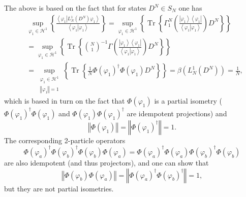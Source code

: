 \documentclass[aps,preprint]{revtex4}%
\begin{document}
The above is based on the fact that for states $D^{N}\in S_{N}$ one has
\begin{align}
&  \sup_{\varphi_{1}\in\mathcal{H}^{1}}\left\{  \frac{\left\langle \left.
\varphi_{1}\right\vert L_{N}^{1}\left(  D^{N}\right)  \varphi_{1}\right\rangle
}{\left\langle \left.  \varphi_{1}\right\vert \varphi_{1}\right\rangle
}\right\}  =\sup_{\varphi_{1}\in\mathcal{H}^{1}}\left\{  \operatorname{Tr}%
\left\{  \Gamma_{1}^{N}\left(  \frac{\left\vert \varphi_{1}\right\rangle
\left\langle \varphi_{1}\right\vert }{\left\langle \left.  \varphi
_{1}\right\vert \varphi_{1}\right\rangle }\right)  D^{N}\right\}  \right\} \\
&  \left.  =\right.  \sup_{\varphi_{1}\in\mathcal{H}^{1}}\left\{
\operatorname{Tr}\left\{  \binom{N}{1}^{-1}\Gamma\left(  \frac{\left\vert
\varphi_{1}\right\rangle \left\langle \varphi_{1}\right\vert }{\left\langle
\left.  \varphi_{1}\right\vert \varphi_{1}\right\rangle }\right)
D^{N}\right\}  \right\} \\
&  \left.  =\right.  \sup_{\substack{\varphi_{1}\in\mathcal{H}^{1}\\\left\Vert
\varphi_{1}\right\Vert =1}}\left\{  \operatorname{Tr}\left\{  \frac{1}{N}%
\Phi\left(  \varphi_{1}\right)  ^{\dagger}\Phi\left(  \varphi_{1}\right)
D^{N}\right\}  \right\}  =\beta\left(  L_{N}^{1}\left(  D^{N}\right)  \right)
=\frac{1}{N},
\end{align}
which is based in turn on the fact that $\Phi\left(  \varphi_{1}\right)  $ is
a partial isometry ($\Phi\left(  \varphi_{1}\right)  ^{\dagger}\Phi\left(
\varphi_{1}\right)  $ and $\Phi\left(  \varphi_{1}\right)  \Phi\left(
\varphi_{1}\right)  ^{\dagger}$ are idempotent projections) and
\begin{equation}
\left\Vert \Phi\left(  \varphi_{1}\right)  \right\Vert =\left\Vert \Phi\left(
\varphi_{1}\right)  ^{\dagger}\right\Vert =1.
\end{equation}
The corresponding 2-particle operators
\begin{equation}
\Phi\left(  \varphi_{a}\right)  ^{\dagger}\Phi\left(  \varphi_{b}\right)
^{\dagger}\Phi\left(  \varphi_{b}\right)  \Phi\left(  \varphi_{a}\right)
=\Phi\left(  \varphi_{a}\right)  ^{\dagger}\Phi\left(  \varphi_{a}\right)
\Phi\left(  \varphi_{b}\right)  ^{\dagger}\Phi\left(  \varphi_{b}\right)
\end{equation}
are also idempotent (and thus projectors), and one can show that
\begin{equation}
\left\Vert \Phi\left(  \varphi_{b}\right)  \Phi\left(  \varphi_{a}\right)
\right\Vert =\left\Vert \Phi\left(  \varphi_{a}\right)  ^{\dagger}\Phi\left(
\varphi_{b}\right)  ^{\dagger}\right\Vert =1,
\end{equation}
but they are not partial isometries.
\end{document}
